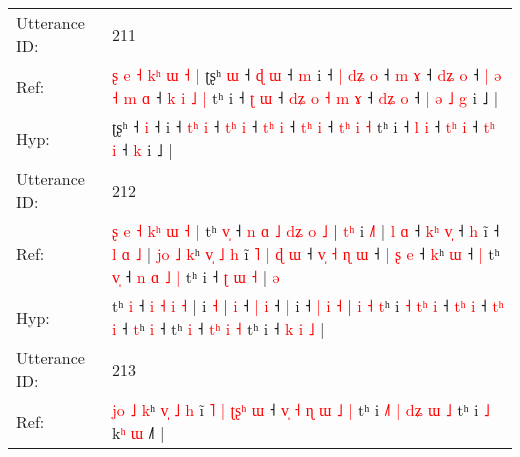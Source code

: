 \documentclass[10pt]{article}
\DeclareRobustCommand{\hl}[1]{{\textcolor{red}{#1}}}
\begin{document}
\begin{longtable}{ll}
 \\
\midrule
Utterance ID: & 211 \\
Ref: & \hl{ʂ}\hl{ }\hl{e}\hl{ }\hl{˧}\hl{ }\hl{k}\hl{ʰ}\hl{ }\hl{ɯ}\hl{ }\hl{˧}\hl{ }\hl{|}\hl{ }ʈʂʰ\hl{ }\hl{ɯ} ˧\hl{ }\hl{ɖ} \hl{ɯ} ˧\hl{ }\hl{m} i ˧\hl{ }\hl{|} \hl{d}\hl{ʑ} \hl{o} ˧ \hl{}\hl{m} \hl{ɤ} ˧ \hl{d}\hl{ʑ} \hl{o} ˧\hl{ }\hl{|}\hl{ }\hl{ə} \hl{˧}\hl{ }\hl{m} \hl{ɑ} ˧ \hl{k}\hl{ }\hl{i} \hl{˩} \hl{|} tʰ i ˧ \hl{ʈ} \hl{ɯ} ˧\hl{ }\hl{d}\hl{ʑ}\hl{ }\hl{o} \hl{˧}\hl{ }\hl{m} \hl{ɤ} ˧ \hl{d}\hl{ʑ} \hl{o} ˧\hl{ }\hl{|}\hl{ }\hl{ə}\hl{ }\hl{˩} \hl{g} i ˩ |
 \\
Hyp: & \hl{}\hl{}\hl{}\hl{}\hl{}\hl{}\hl{}\hl{}\hl{}\hl{}\hl{}\hl{}\hl{}\hl{}\hl{}ʈʂʰ\hl{}\hl{} ˧\hl{}\hl{} \hl{i} ˧\hl{}\hl{} i ˧\hl{}\hl{} \hl{t}\hl{ʰ} \hl{i} ˧ \hl{t}\hl{ʰ} \hl{i} ˧ \hl{t}\hl{ʰ} \hl{i} ˧\hl{}\hl{}\hl{}\hl{} \hl{}\hl{t}\hl{ʰ} \hl{i} ˧ \hl{}\hl{t}\hl{ʰ} \hl{i} \hl{˧} tʰ i ˧ \hl{l} \hl{i} ˧\hl{}\hl{}\hl{}\hl{}\hl{} \hl{}\hl{t}\hl{ʰ} \hl{i} ˧ \hl{t}\hl{ʰ} \hl{i} ˧\hl{}\hl{}\hl{}\hl{}\hl{}\hl{} \hl{k} i ˩ |
 \\
\midrule
Utterance ID: & 212 \\
Ref: & \hl{ʂ}\hl{ }\hl{e}\hl{ }\hl{˧}\hl{ }\hl{k}\hl{ʰ}\hl{ }\hl{ɯ}\hl{ }\hl{˧}\hl{ }\hl{|}\hl{ }tʰ \hl{v}\hl{̩} ˧\hl{ }\hl{n}\hl{ }\hl{ɑ} \hl{˩} \hl{d}\hl{ʑ} \hl{o} \hl{˩} |\hl{ }\hl{t}\hl{ʰ} i \hl{˩}\hl{˥} |\hl{ }\hl{l} \hl{ɑ} ˧ \hl{k}\hl{ʰ} \hl{v}\hl{̩} ˧ \hl{h} i\hl{̃} ˧ \hl{l} \hl{ɑ} \hl{˩} | \hl{j}\hl{o} \hl{˩} \hl{k}ʰ\hl{ }\hl{v}\hl{̩}\hl{ }\hl{˩}\hl{ }\hl{h} i\hl{̃} \hl{˥} \hl{|}\hl{ }\hl{ɖ} \hl{ɯ} ˧\hl{ }\hl{v}\hl{̩} \hl{˧}\hl{ }\hl{ɳ} \hl{ɯ} ˧ \hl{|}\hl{ }\hl{ʂ} \hl{e} ˧ \hl{k}ʰ \hl{ɯ} ˧\hl{ }\hl{|} tʰ \hl{v}\hl{̩} ˧ \hl{n}\hl{ }\hl{ɑ} \hl{˩} \hl{|} tʰ i ˧ \hl{ʈ} \hl{ɯ} \hl{˧} |\hl{ }\hl{ə}
 \\
Hyp: & \hl{}\hl{}\hl{}\hl{}\hl{}\hl{}\hl{}\hl{}\hl{}\hl{}\hl{}\hl{}\hl{}\hl{}\hl{}tʰ \hl{}\hl{i} ˧\hl{}\hl{}\hl{}\hl{} \hl{i} \hl{}\hl{˧} \hl{i} \hl{˧} |\hl{}\hl{}\hl{} i \hl{}\hl{˧} |\hl{}\hl{} \hl{i} ˧ \hl{}\hl{|} \hl{}\hl{i} ˧ \hl{|} i\hl{} ˧ \hl{|} \hl{i} \hl{˧} | \hl{}\hl{i} \hl{˧} \hl{t}ʰ\hl{}\hl{}\hl{}\hl{}\hl{}\hl{}\hl{} i\hl{} \hl{˧} \hl{}\hl{t}\hl{ʰ} \hl{i} ˧\hl{}\hl{}\hl{} \hl{}\hl{t}\hl{ʰ} \hl{i} ˧ \hl{}\hl{t}\hl{ʰ} \hl{i} ˧ \hl{t}ʰ \hl{i} ˧\hl{}\hl{} tʰ \hl{}\hl{i} ˧ \hl{}\hl{t}\hl{ʰ} \hl{i} \hl{˧} tʰ i ˧ \hl{k} \hl{i} \hl{˩} |\hl{}\hl{}
 \\
\midrule
Utterance ID: & 213 \\
Ref: & \hl{j}\hl{o}\hl{ }\hl{˩}\hl{ }\hl{k}ʰ\hl{ }\hl{v}\hl{̩}\hl{ }\hl{˩}\hl{ }\hl{h} i\hl{̃} \hl{˥} \hl{|} \hl{ʈ}\hl{ʂ}\hl{ʰ} \hl{ɯ} ˧ \hl{v}\hl{̩} \hl{˧} \hl{ɳ} \hl{ɯ} \hl{˩} \hl{|} tʰ i\hl{ }\hl{˩}\hl{˥}\hl{ }\hl{|}\hl{ }\hl{d}\hl{ʑ}\hl{ }\hl{ɯ} \hl{˩} tʰ i \hl{˩} k\hl{ʰ} \hl{ɯ} ˩\hl{˥} |

\end{longtable}
\end{document}
